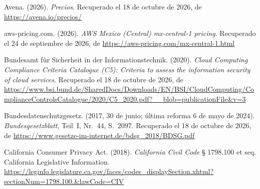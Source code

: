 \documentclass[12pt, a4paper]{article}
\begin{document}
\begin{list}{}{\setlength{\leftmargin}{1.27cm}\setlength{\itemindent}{-1.27cm}%
  \setlength{\labelwidth}{0pt}\setlength{\labelsep}{0pt}\setlength{\itemsep}{6pt}}
\item Avena. (2026). \textit{Precios}. Recuperado el 18 de octubre de 2026, de \url{https://avena.io/precios/}
 
 
\item aws-pricing.com. (2026). \textit{AWS Mexico (Central)
  mx-central-1 pricing}. Recuperado el 24 de septiembre de 2026, de
  \url{https://aws-pricing.com/mx-central-1.html}
 

\item Bundesamt für Sicherheit in der Informationstechnik. (2020).
  \textit{Cloud Computing Compliance Criteria Catalogue (C5):
  Criteria to assess the information security of cloud services}. Recuperado el 18 de octubre de 2026, de \url{https://www.bsi.bund.de/SharedDocs/Downloads/EN/BSI/CloudComputing/ComplianceControlsCatalogue/2020/C5_2020.pdf?__blob=publicationFile&v=3}

 
\item Bundesdatenschutzgesetz. (2017, 30 de junio; última reforma
  6 de mayo de 2024). \textit{Bundesgesetzblatt}, Teil~I, Nr.~44,
  S.~2097.
  Recuperado el 18 de octubre de 2026, de \url{https://www.gesetze-im-internet.de/bdsg_2018/BDSG.pdf}



\item California Consumer Privacy Act. (2018). \textit{California
  Civil Code} § 1798.100 et seq. California Legislative Information. \url{https://leginfo.legislature.ca.gov/faces/codes_displaySection.xhtml?sectionNum=1798.100.&lawCode=CIV}


\end{list}
\end{document}
